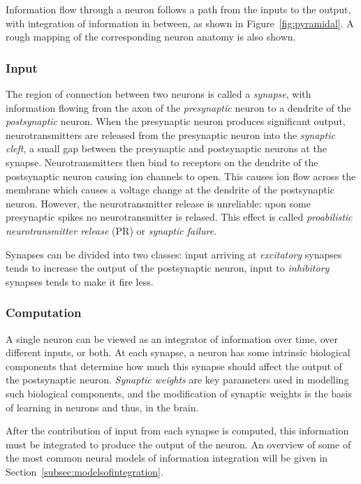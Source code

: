 \documentclass[a4paper,12pt]{report}
\theoremstyle{definition}
\begin{document}
Information flow through a neuron follows a path from the inputs to the output, with integration of information in between, as shown in Figure~\ref{fig:pyramidal}. A rough mapping of the corresponding neuron anatomy is also shown.


\subsubsection{Input}

The region of connection between two neurons is called a \emph{synapse}, with information flowing from the axon of the \emph{presynaptic} neuron to a dendrite of the \emph{postsynaptic} neuron. When the presynaptic neuron produces significant output, neurotransmitters are released from the presynaptic neuron into the \emph{synaptic cleft}, a small gap between the presynaptic and postsynaptic neurons at the synapse.
Neurotransmitters then bind to receptors on the dendrite of the postsynaptic neuron causing ion channels to open. This causes ion flow across the membrane which causes a voltage change at the dendrite of the postsynaptic neuron. However, the neurotransmitter release is unreliable: upon some presynaptic spikes no neurotransmitter is relased. This effect is called \emph{proabilistic neurotransmitter release} (PR) or \emph{synaptic failure}.

Synapses can be divided into two classes: input arriving at \emph{excitatory} synapses tends to increase the output of the postsynaptic neuron, input to \emph{inhibitory} synapses tends to make it fire less.

\subsubsection{Computation}
A single neuron can be viewed as an integrator of information over time, over different inputs, or both. At each synapse, a neuron has some intrinsic biological components that determine how much this synapse should affect the output of the postsynaptic neuron. \emph{Synaptic weights} are key parameters used in modelling such biological components, and the modification of synaptic weights is the basis of learning in neurons and thus, in the brain.

After the contribution of input from each synapse is computed, this information must be integrated to produce the output of the neuron. An overview of some of the most common neural models of information integration will be given in Section~\ref{subsec:modelsofintegration}.
\end{document}
